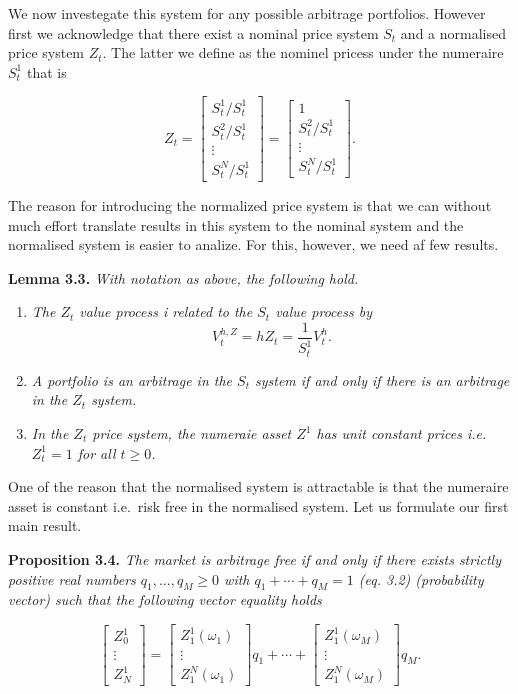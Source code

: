 \documentclass[
]{article}
\providecommand{\tightlist}{%
  \setlength{\itemsep}{0pt}\setlength{\parskip}{0pt}}
\begin{document}
We now investegate this system for any possible arbitrage portfolios.
However first we acknowledge that there exist a nominal price system
\(S_t\) and a normalised price system \(Z_t\). The latter we define as
the nominel pricess under the numeraire \(S_t^1\) that is

\[
Z_t=\begin{bmatrix} S_t^1/S_t^1\\
S_t^2/S_t^1\\
\vdots\\
S_t^N/S_t^1\end{bmatrix}=\begin{bmatrix} 1\\
S_t^2/S_t^1\\
\vdots\\
S_t^N/S_t^1\end{bmatrix}.
\]

The reason for introducing the normalized price system is that we can
without much effort translate results in this system to the nominal
system and the normalised system is easier to analize. For this,
however, we need af few results.

\textbf{Lemma 3.3.} \emph{With notation as above, the following hold.}

\begin{enumerate}
\def\labelenumi{\arabic{enumi}.}
\tightlist
\item
  \emph{The \(Z_t\) value process i related to the \(S_t\) value process
  by} \[
    V_t^{h,Z}=hZ_t=\frac{1}{S_t^1}V_t^h.
    \]
\item
  \emph{A portfolio is an arbitrage in the \(S_t\) system if and only if
  there is an arbitrage in the \(Z_t\) system.}
\item
  \emph{In the \(Z_t\) price system, the numeraie asset \(Z^1\) has unit
  constant prices i.e.~\(Z_t^1=1\) for all \(t\ge 0\).}
\end{enumerate}

One of the reason that the normalised system is attractable is that the
numeraire asset is constant i.e.~risk free in the normalised system. Let
us formulate our first main result.

\textbf{Proposition 3.4.} \emph{The market is arbitrage free if and only
if there exists strictly positive real numbers \(q_1,...,q_M\ge 0\) with
\(q_1+\cdots + q_M=1\) (eq. 3.2) (probability vector) such that the
following vector equality holds}

\[
\begin{bmatrix} Z_0^1\\
\vdots\\
Z_N^1\end{bmatrix}=\begin{bmatrix} Z_1^1(\omega_1)\\
\vdots\\
Z_1^N(\omega_1)\end{bmatrix}q_1+\cdots +\begin{bmatrix} Z_1^1(\omega_M)\\
\vdots\\
Z_1^N(\omega_M)\end{bmatrix}q_M.\tag{3.3}
\]
\end{document}
